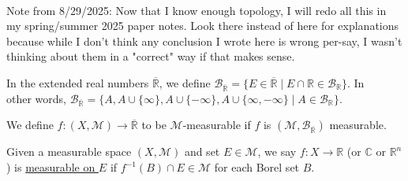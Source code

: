 \documentclass{book}
\newcommand{\hOne}{%
   \color{Black}%
   \fontsize{14}{16}\selectfont%
}
\newcommand{\myComment}{%
   \color{RawerSienna}%
   \fontsize{12}{14}\selectfont%
}
\newcommand{\udefine}[1]{{%
   \setulcolor{Red}%
   \setul{0.14em}{0.07em}%
   \ul{#1}%
}}
\newcommand{\mySepTwo}[1][.]{%
   {\noindent\color{#1}{\rule{6.5in}{0.5mm}}}\\%
}
\newcommand{\retTwo}{\hfill\bigbreak}
\begin{document}
\myComment\mySepTwo

Note from 8/29/2025: Now that I know enough topology, I will redo all this in my spring/summer 2025 paper notes. Look there instead of here for explanations because while I don't think any conclusion I wrote here is wrong per-say, I wasn't thinking about them in a "correct" way if that makes sense.\retTwo

\hOne In the extended real numbers $\overline{\mathbb{R}}$, we define $\mathcal{B}_{\overline{\mathbb{R}}} = \{E \in \overline{\mathbb{R}} \mid E \cap \mathbb{R} \in \mathcal{B}_{\mathbb{R}}\}$. In\\ other words, $\mathcal{B}_{\overline{\mathbb{R}}} = \{A, A \cup\{\infty\}, A \cup\{-\infty\}, A \cup\{\infty, -\infty\} \mid A \in \mathcal{B}_{\mathbb{R}} \}$.\retTwo

We define $f: (X, \mathcal{M}) \longrightarrow \overline{\mathbb{R}}$ to be $\mathcal{M}$-measurable if $f$ is $(\mathcal{M}, \mathcal{B}_{\overline{\mathbb{R}}})$ measurable.\retTwo

Given a measurable space $(X, \mathcal{M})$ and set $E \in \mathcal{M}$, we say $f: X \longrightarrow \mathbb{R}$ (or $\mathbb{C}$ or $\mathbb{R}^n$) is \udefine{measurable on $E$} if $f^{-1}(B) \cap E \in \mathcal{M}$ for each Borel set $B$.\retTwo
\end{document}
